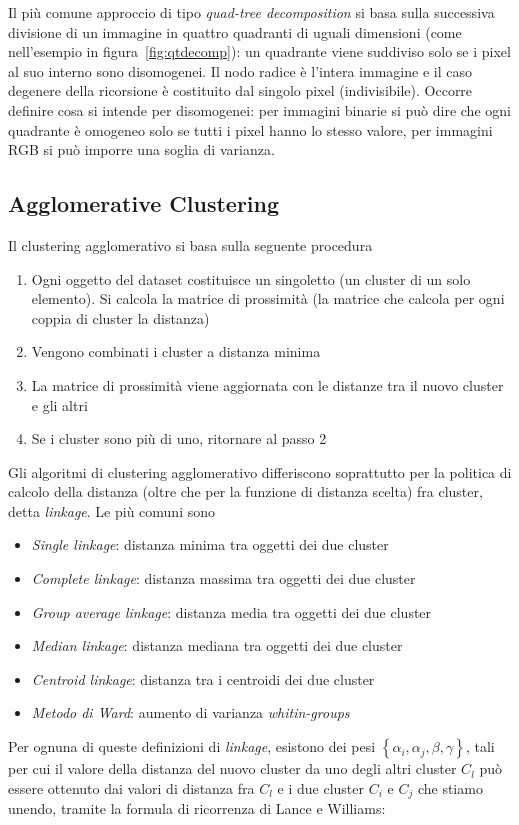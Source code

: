 \documentclass[\main/main.tex]{subfiles}
\newcommand{\graffe}[1]{\left\lbrace #1 \right\rbrace}
\begin{document}
Il più comune approccio di tipo \textit{quad-tree decomposition} si basa sulla successiva divisione di un immagine in quattro quadranti di uguali dimensioni (come nell'esempio in figura~\ref{fig:qtdecomp}): un quadrante viene suddiviso solo se i pixel al suo interno sono disomogenei. Il nodo radice è l'intera immagine e il caso degenere della ricorsione è costituito dal singolo pixel (indivisibile). Occorre definire cosa si intende per disomogenei: per immagini binarie si può dire che ogni quadrante è omogeneo solo se tutti i pixel hanno lo stesso valore, per immagini RGB si può imporre una soglia di varianza.

\subsection{Agglomerative Clustering}
Il clustering agglomerativo si basa sulla seguente procedura \begin{enumerate}
	\item Ogni oggetto del dataset costituisce un singoletto (un cluster di un solo elemento). Si calcola la matrice di prossimità (la matrice che calcola per ogni coppia di cluster la distanza)
	\item Vengono combinati i cluster a distanza minima
	\item La matrice di prossimità viene aggiornata con le distanze tra il nuovo cluster e gli altri
	\item Se i cluster sono più di uno, ritornare al passo 2
\end{enumerate}
Gli algoritmi di clustering agglomerativo differiscono soprattutto per la politica di calcolo della distanza (oltre che per la funzione di distanza scelta) fra cluster, detta \textit{linkage}. Le più comuni sono\begin{itemize}
	\item \textit{Single linkage}: distanza minima tra oggetti dei due cluster
	\item \textit{Complete linkage}: distanza massima tra oggetti dei due cluster
	\item \textit{Group average linkage}: distanza media tra oggetti dei due cluster
	\item \textit{Median linkage}: distanza mediana tra oggetti dei due cluster
	\item \textit{Centroid linkage}: distanza tra i centroidi dei due cluster
	\item \textit{Metodo di Ward}: aumento di varianza \textit{whitin-groups}
\end{itemize}
Per ognuna di queste definizioni di \textit{linkage}, esistono dei pesi $\graffe{ \alpha_i , \alpha_j , \beta , \gamma }$, tali per cui il valore della distanza del nuovo cluster da uno degli altri cluster $C_l$ può essere ottenuto dai valori di distanza fra $C_l$ e i due cluster $C_i$ e $C_j$ che stiamo unendo, tramite la formula di ricorrenza di Lance e Williams:
\end{document}
